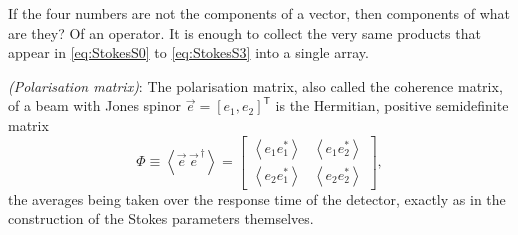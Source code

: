             If the four numbers are not the components of a vector, then components of what are they? Of an operator. It is enough to collect the very same products that appear in \ref{eq:StokesS0} to \ref{eq:StokesS3} into a single array.

            \begin{myDef}
                \textit{(Polarisation matrix)}: The polarisation matrix, also called the coherence matrix, of a beam with Jones spinor $\vec{e}=[e_1,e_2]^{\mathsf{T}}$ is the Hermitian, positive semidefinite matrix
                \begin{equation}\label{eq:CoherenceMatrix}
                    \Phi \equiv \left\langle \vec{e}\,\vec{e}^{\,\dagger}\right\rangle = \begin{bmatrix}
                        \left\langle e_1e_1^*\right\rangle & \left\langle e_1e_2^*\right\rangle \\
                        \left\langle e_2e_1^*\right\rangle & \left\langle e_2e_2^*\right\rangle
                    \end{bmatrix},
                \end{equation}
                the averages being taken over the response time of the detector, exactly as in the construction of the Stokes parameters themselves.
            \end{myDef}

